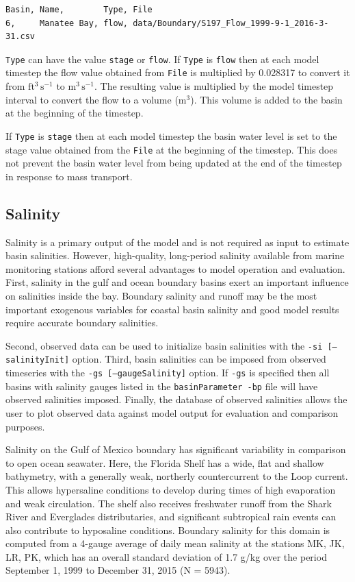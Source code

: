 \begin{verbatim}
Basin, Name,        Type, File
6,     Manatee Bay, flow, data/Boundary/S197_Flow_1999-9-1_2016-3-31.csv
\end{verbatim}

\texttt{Type} can have the value \texttt{stage} or \texttt{flow}. If \texttt{Type} is \texttt{flow} then at each model timestep the flow value obtained from \texttt{File} is multiplied by 0.028317 to convert it from $\mathrm{ft^3\,s^{-1}}$ to $\mathrm{m^3\,s^{-1}}$.  The resulting value is multiplied by the model timestep interval to convert the flow to a volume ($\mathrm{m^3}$).  This volume is added to the basin at the beginning of the timestep. 

If \texttt{Type} is \texttt{stage} then at each model timestep the basin water level is set to the stage value obtained from the \texttt{File} at the beginning of the timestep.  This does not prevent the basin water level from being updated at the end of the timestep in response to mass transport. 

\subsection{Salinity}
\label{sec:Salinity}
Salinity is a primary output of the model and is not required as input to estimate basin salinities.  However, high-quality, long-period salinity available from marine monitoring stations afford several advantages to model operation and evaluation.  First, salinity in the gulf and ocean boundary basins exert an important influence on salinities inside the bay.  Boundary salinity and runoff may be the most important exogenous variables for coastal basin salinity and good model results require accurate boundary salinities. 

Second, observed data can be used to initialize basin salinities with the \texttt{-si [--salinityInit]} option.  Third, basin salinities can be imposed from observed timeseries with the \texttt{-gs [--gaugeSalinity]} option.  If \texttt{-gs} is specified then all basins with salinity gauges listed in the \texttt{basinParameter -bp} file will have observed salinities imposed. Finally, the database of observed salinities allows the user to plot observed data against model output for evaluation and comparison purposes.

Salinity on the Gulf of Mexico boundary has significant variability in comparison to open ocean seawater.  Here, the Florida Shelf has a wide, flat and shallow bathymetry, with a generally weak, northerly countercurrent to the Loop current. This allows hypersaline conditions to develop during times of high evaporation and weak circulation.  The shelf also receives freshwater runoff from the Shark River and Everglades distributaries, and significant subtropical rain events can also contribute to hyposaline conditions.  Boundary salinity for this domain is computed from a 4-gauge average of daily mean salinity at the stations MK, JK, LR, PK, which has an overall standard deviation of 1.7 g/kg over the period September 1, 1999 to December 31, 2015 (N = 5943).

